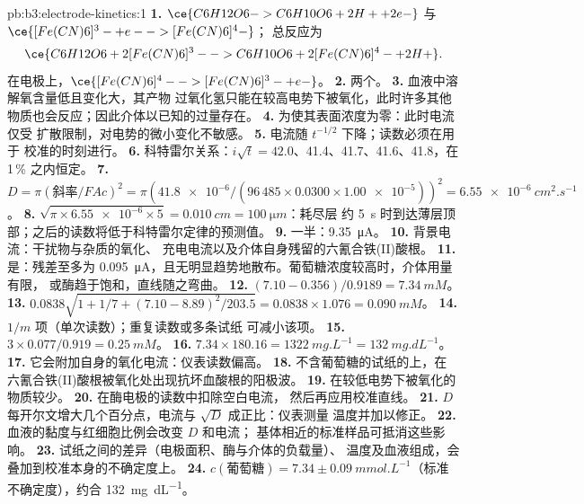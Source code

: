 \begin{solution}{pb:b3:electrode-kinetics:1}
\textbf{1.} $\ce{C6H12O6 -> C6H10O6 + 2 H+ + 2 e-}$ 与 $\ce{[Fe(CN)6]^3- + e- -> [Fe(CN)6]^4-}$；
总反应为
\[
  \ce{C6H12O6 + 2 [Fe(CN)6]^3- -> C6H10O6 + 2 [Fe(CN)6]^4- + 2 H+} .
\]
在电极上，$\ce{[Fe(CN)6]^4- -> [Fe(CN)6]^3- + e-}$。
\textbf{2.} 两个。
\textbf{3.} 血液中溶解氧含量低且变化大，其产物
过氧化氢只能在较高电势下被氧化，此时许多其他
物质也会反应；因此介体以已知的过量存在。
\textbf{4.} 为使其表面浓度为零：此时电流仅受
扩散限制，对电势的微小变化不敏感。
\textbf{5.} 电流随 $t^{-1/2}$ 下降；读数必须在用于
校准的时刻进行。
\textbf{6.} 科特雷尔关系：$i\sqrt t = 42.0$、41.4、41.7、41.6、41.8，在 1\,\% 之内恒定。
\textbf{7.} $D = \pi(\text{斜率}/FAc)^2 = \pi(\num{41.8e-6}/(96\,485 \times 0.0300 \times \num{1.00e-5}))^2 = \qty{6.55e-6}{cm^2.s^{-1}}$。
\textbf{8.} $\sqrt{\pi \times \num{6.55e-6} \times 5} = \qty{0.010}{cm} = \qty{100}{\micro m}$：耗尽层
约 \qty{5}{s} 时到达薄层顶部；之后的读数将低于科特雷尔定律的预测值。
\textbf{9.} 一半：\qty{9.35}{\micro A}。
\textbf{10.} 背景电流：干扰物与杂质的氧化、
充电电流以及介体自身残留的六氰合铁(II)酸根。
\textbf{11.} 是：残差至多为 \qty{0.095}{\micro A}，且无明显趋势地散布。葡萄糖浓度较高时，介体用量有限，
或酶趋于饱和，直线随之弯曲。
\textbf{12.} $(7.10 - 0.356)/0.9189 = \qty{7.34}{mM}$。
\textbf{13.} $0.0838\sqrt{1 + 1/7 + (7.10 - 8.89)^2/203.5} = 0.0838 \times 1.076 = \qty{0.090}{mM}$。
\textbf{14.} $1/m$ 项（单次读数）；重复读数或多条试纸
可减小该项。
\textbf{15.} $3 \times 0.077/0.919 = \qty{0.25}{mM}$。
\textbf{16.} $7.34 \times 180.16 = \qty{1322}{mg.L^{-1}} = \qty{132}{mg.dL^{-1}}$。
\textbf{17.} 它会附加自身的氧化电流：仪表读数偏高。
\textbf{18.} 不含葡萄糖的试纸的上，在
六氰合铁(II)酸根被氧化处出现抗坏血酸根的阳极波。
\textbf{19.} 在较低电势下被氧化的物质较少。
\textbf{20.} 在酶电极的读数中扣除空白电流，
然后再应用校准直线。
\textbf{21.} $D$ 每开尔文增大几个百分点，电流与 $\sqrt D$ 成正比：仪表测量
温度并加以修正。
\textbf{22.} 血液的黏度与红细胞比例会改变 $D$ 和电流；
基体相近的标准样品可抵消这些影响。
\textbf{23.} 试纸之间的差异（电极面积、酶与介体的负载量）、
温度及血液组成，会叠加到校准本身的不确定度上。
\textbf{24.} \textbf{$c(\text{葡萄糖}) = 7.34 \pm \qty{0.09}{mmol.L^{-1}}$}（标准不确定度），约合 \qty{132}{mg.dL^{-1}}。
\end{solution}
